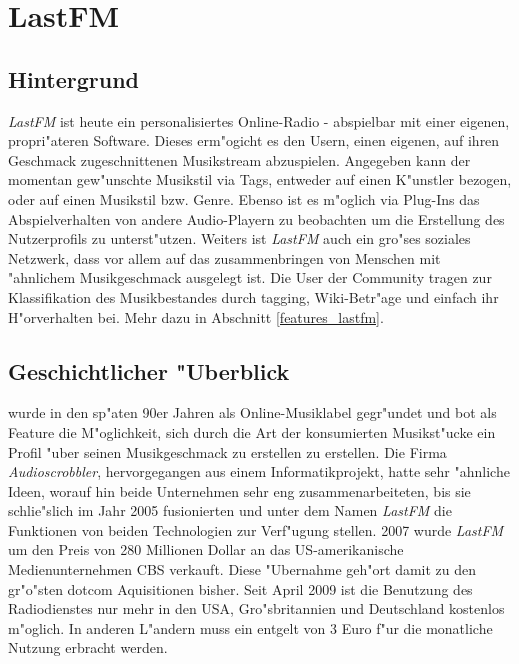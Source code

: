 \section{LastFM}
\subsection{Hintergrund}
\textit{LastFM} ist heute ein personalisiertes Online-Radio - abspielbar mit einer eigenen, propri"ateren Software. Dieses erm"ogicht es den Usern, einen eigenen, auf ihren Geschmack zugeschnittenen Musikstream abzuspielen. Angegeben kann der momentan gew"unschte Musikstil via Tags, entweder auf einen K"unstler bezogen, oder auf einen Musikstil bzw. Genre. Ebenso ist es m"oglich via Plug-Ins das Abspielverhalten von andere Audio-Playern zu beobachten um die Erstellung des Nutzerprofils zu unterst"utzen.
Weiters ist \textit{LastFM} auch ein gro"ses soziales Netzwerk, dass vor allem auf das zusammenbringen von Menschen mit "ahnlichem Musikgeschmack ausgelegt ist. Die User der Community tragen zur Klassifikation des Musikbestandes durch tagging, Wiki-Betr"age und einfach ihr H"orverhalten bei. Mehr dazu in Abschnitt \ref{features_lastfm}.

\subsection{Geschichtlicher "Uberblick}
 wurde in den sp"aten 90er Jahren als Online-Musiklabel gegr"undet und bot als Feature die M"oglichkeit, sich durch die Art der konsumierten Musikst"ucke ein Profil "uber seinen Musikgeschmack zu erstellen zu erstellen. Die Firma \textit{Audioscrobbler}, hervorgegangen aus einem Informatikprojekt, hatte sehr "ahnliche Ideen, worauf hin beide Unternehmen sehr eng zusammenarbeiteten, bis sie schlie"slich im Jahr 2005 fusionierten und unter dem Namen \textit{LastFM} die Funktionen von beiden Technologien zur Verf"ugung stellen.
2007 wurde \textit{LastFM} um den Preis von 280 Millionen Dollar an das US-amerikanische Medienunternehmen CBS verkauft. Diese "Ubernahme geh"ort damit zu den gr"o"sten dotcom Aquisitionen bisher. 
Seit April 2009 ist die Benutzung des Radiodienstes nur mehr in den USA, Gro"sbritannien und Deutschland kostenlos m"oglich. In anderen L"andern muss ein entgelt von 3 Euro f"ur die monatliche Nutzung erbracht werden.



